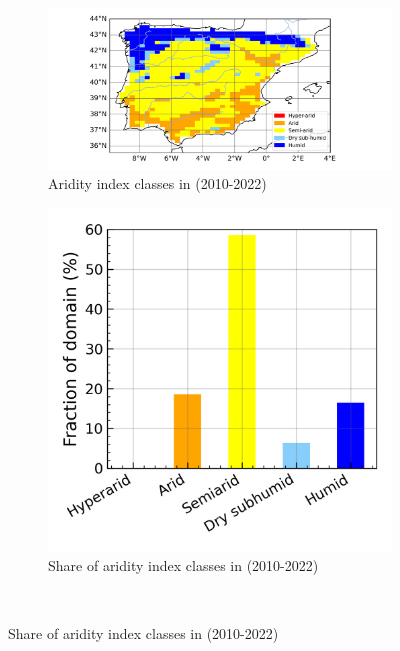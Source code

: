 \begin{figure}[htbp]
    \centering
    \begin{subfigure}[b]{0.67\textwidth}
        \caption{Aridity index classes in \presnoirr (2010-2022)}
        \includegraphics[width=\textwidth]{images/chap4/future/aridity_index_pres_noirr.png}
    \end{subfigure}
    \begin{subfigure}[b]{0.31\textwidth}
        \caption{Share of aridity index classes in \presnoirr (2010-2022)}
        \includegraphics[width=\textwidth]{images/chap4/future/aridity_index_distribution_pres_noirr.png}
    \end{subfigure} \\


\end{figure}
